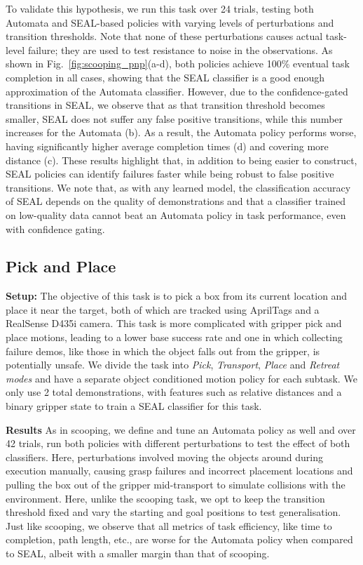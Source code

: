 \documentclass[journal]{IEEEtran}
\begin{document}
    To validate this hypothesis, we run this task over 24 trials, testing both Automata and SEAL-based policies with varying levels of perturbations and transition thresholds. Note that none of these perturbations causes actual task-level failure; they are used to test resistance to noise in the observations. As shown in Fig.~\ref{fig:scooping_pnp}(a-d), both policies achieve 100\% eventual task completion in all cases, showing that the SEAL classifier is a good enough approximation of the Automata classifier. However, due to the confidence-gated transitions in SEAL, we observe that as that transition threshold becomes smaller, SEAL does not suffer any false positive transitions, while this number increases for the Automata (b). As a result, the Automata policy performs worse, having significantly higher average completion times (d) and covering more distance (c). These results highlight that, in addition to being easier to construct, SEAL policies can identify failures faster while being robust to false positive transitions. We note that, as with any learned model, the classification accuracy of SEAL depends on the quality of demonstrations and that a classifier trained on low-quality data cannot beat an Automata policy in task performance, even with confidence gating.



\subsection{Pick and Place}

\textbf{Setup: }
The objective of this task is to pick a box from its current location and place it near the target, both of which are tracked using AprilTags \cite{7759617} and a RealSense D435i camera.
This task is more complicated with gripper pick and place motions, leading to a lower base success rate and one in which collecting failure demos, like those in which the object falls out from the gripper, is potentially unsafe. We divide the task into \textit{Pick}, \textit{Transport}, \textit{Place} and \textit{Retreat modes} and have a separate object conditioned motion policy for each subtask.  We only use 2 total demonstrations, with features such as relative distances and a binary gripper state to train a SEAL classifier for this task.

\textbf{Results} As in scooping, we define and tune an Automata policy as well and over 42 trials, run both policies with different perturbations to test the effect of both classifiers. Here, perturbations involved moving the objects around during execution manually, causing grasp failures and incorrect placement locations and pulling the box out of the gripper mid-transport to simulate collisions with the environment. Here, unlike the scooping task, we opt to keep the transition threshold fixed and vary the starting and goal positions to test generalisation. Just like scooping, we observe that all metrics of task efficiency, like time to completion, path length, etc., are worse for the Automata policy when compared to SEAL, albeit with a smaller margin than that of scooping.
\end{document}
